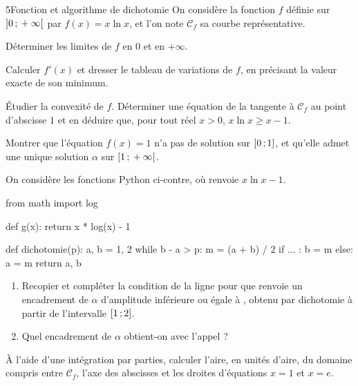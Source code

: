 \begin{exoBac}{5}{Fonction et algorithme de dichotomie}
On considère la fonction $f$ définie sur $\mathopen{]}0\,{;}\,+\infty\mathclose{[}$ par $f(x)=x\ln x$, et l'on note $\mathcal{C}_f$ sa courbe représentative.
\begin{questions}
  \item Déterminer les limites de $f$ en $0$ et en $+\infty$.
  \item Calculer $f'(x)$ et dresser le tableau de variations de $f$, en précisant la valeur exacte de son minimum.
  \item Étudier la convexité de $f$. Déterminer une équation de la tangente à $\mathcal{C}_f$ au point d'abscisse $1$ et en déduire que,
    pour tout réel $x>0$, $x\ln x\geq x-1$.
\end{questions}
\begin{questions}[resume]
  \item Montrer que l'équation $f(x)=1$ n'a pas de solution sur $\mathopen{]}0\,{;}\,1\mathclose{]}$, et qu'elle admet une unique solution $\alpha$ sur
    $\mathopen{[}1\,{;}\,+\infty\mathclose{[}$.
  \item On considère les fonctions Python ci-contre, où  renvoie $x\ln x-1$.
\begin{codecote}[0.46]
\begin{pythoncol}
from math import log

def g(x):
    return x * log(x) - 1

def dichotomie(p):
    a, b = 1, 2
    while b - a > p:
        m = (a + b) / 2
        if ... :
            b = m
        else:
            a = m
    return a, b
\end{pythoncol}
\cote
\begin{enumerate}[label=\alph*),leftmargin=1.4em,itemsep=0.6mm,topsep=0mm]
  \item Recopier et compléter la condition de la ligne  pour que  renvoie un encadrement de $\alpha$
    d'amplitude inférieure ou égale à , obtenu par dichotomie à partir de l'intervalle $\mathopen{[}1\,{;}\,2\mathclose{]}$.
  \item Quel encadrement de $\alpha$ obtient-on avec l'appel  ?
\end{enumerate}
\end{codecote}
  \item À l'aide d'une intégration par parties, calculer l'aire, en unités d'aire, du domaine compris entre $\mathcal{C}_f$, l'axe des
    abscisses et les droites d'équations $x=1$ et $x=e$.
\end{questions}
\end{exoBac}
